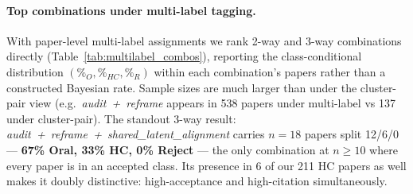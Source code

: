 \documentclass[10pt,a4paper]{article}
\begin{document}
\paragraph{Top combinations under multi-label tagging.}
With paper-level multi-label assignments we rank 2-way and 3-way combinations directly (Table~\ref{tab:multilabel_combos}), reporting the class-conditional distribution \((\%_O, \%_{HC}, \%_R)\) within each combination's papers rather than a constructed Bayesian rate. Sample sizes are much larger than under the cluster-pair view (e.g.\ \emph{audit~+~reframe} appears in 538 papers under multi-label vs 137 under cluster-pair). The standout 3-way result: \emph{audit~+~reframe~+~shared\_latent\_alignment} carries \(n=18\) papers split 12/6/0 — \textbf{67\% Oral, 33\% HC, 0\% Reject} — the only combination at \(n \geq 10\) where every paper is in an accepted class. Its presence in 6 of our 211 HC papers as well makes it doubly distinctive: high-acceptance and high-citation simultaneously.
\end{document}
